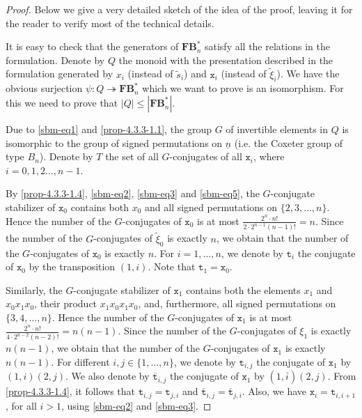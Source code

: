 \documentclass[a4paper]{amsart}
\newcommand{\tto}{\twoheadrightarrow}
\begin{document}
\begin{proof}
Below we give a very detailed sketch of the idea of the proof,
leaving it for the reader to verify most of the technical details.

It is easy to check that the generators of $\mathbf{FB}^*_n$
satisfy all the relations in the formulation.
Denote by $Q$ the monoid with the presentation described in the 
formulation generated by $x_i$ (instead of $\tilde{s}_i$)
and $\mathtt{x}_i$ (instead of $\tilde{\xi}_i$). 
We have the obvious surjection $\psi:Q\tto \mathbf{FB}^*_n$
which we want to prove is an isomorphism. For this we need to prove
that $|Q|\leq |\mathbf{FB}^*_n|$.

Due to \eqref{sbm-eq1} and \eqref{prop-4.3.3-1.1}, the group $G$ of invertible
elements in $Q$ is isomorphic to the group of  signed permutations on $\underline{n}$
(i.e. the Coxeter group of type $B_n$).
Denote by $T$ the set of all $G$-conjugates of all $\mathtt{x}_i$,
where $i=0,1,2\dots,n-1$.

By \eqref{prop-4.3.3-1.4}, \eqref{sbm-eq2}, \eqref{sbm-eq3} and \eqref{sbm-eq5},
the $G$-conjugate stabilizer of ${\mathtt{x}}_0$ contains both 
$x_0$ and all signed permutations on $\{2,3,\dots,n\}$. Hence the number of
the $G$-conjugates of ${\mathtt{x}}_0$ is at most
$\frac{2^n\cdot n!}{2\cdot 2^{n-1}(n-1)!}=n$. Since the number of 
the $G$-conjugates of $\tilde{\xi}_0$ is exactly $n$,
we obtain that the number of
the $G$-conjugates of ${\mathtt{x}}_0$ is exactly $n$.
For $i=1,\dots,n$, we denote by $\mathtt{t}_i$ the conjugate of 
${\mathtt{x}}_0$ by the transposition $(1,i)$. Note that $\mathtt{t}_1={\mathtt{x}}_0$.

Similarly, the $G$-conjugate stabilizer of ${\mathtt{x}}_1$ contains both 
the elements $x_1$ and $x_0x_1x_0$, their product $x_1x_0x_1x_0$, and, furthermore, 
all signed permutations on $\{3,4,\dots,n\}$. Hence the number of
the $G$-conjugates of ${\mathtt{x}}_1$ is at most
$\frac{2^n\cdot n!}{4\cdot 2^{n-2}(n-2)!}=n(n-1)$. Since the number of 
the $G$-conjugates of ${\xi}_1$ is exactly $n(n-1)$,
we obtain that the number of
the $G$-conjugates of ${\mathtt{x}}_1$ is exactly $n(n-1)$.
For different $i,j\in\{1,\dots,n\}$, we denote by $\mathtt{t}_{i,j}$ 
the conjugate of ${\mathtt{x}}_1$ by $(1,i)(2,j)$.
We also denote by $\overline{\mathtt{t}}_{i,j}$ 
the conjugate of ${\mathtt{x}}_1$ by $(1,\overline{i})(2,{j})$.
From \eqref{prop-4.3.3-1.4}, it follows that $\mathtt{t}_{i,j}=\mathtt{t}_{j,i}$
and $\overline{\mathtt{t}}_{i,j}=\overline{\mathtt{t}}_{j,i}$.
Also, we have ${\mathtt{x}}_i=\mathtt{t}_{i,i+1}$, for all
$i>1$, using \eqref{sbm-eq2} and \eqref{sbm-eq3}.


\end{proof}
\end{document}
